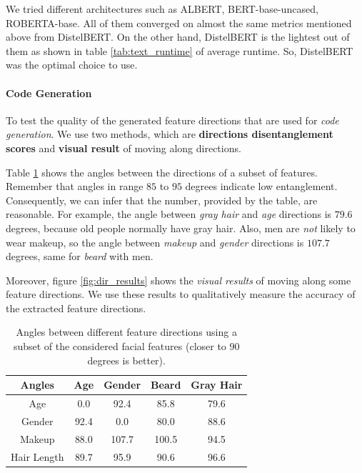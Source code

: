 We tried different architectures such as ALBERT, BERT-base-uncased, ROBERTA-base. All of them converged on almost the same metrics mentioned above from DistelBERT. On the other hand, DistelBERT is the lightest out of them as shown in table \ref{tab:text_runtime} of average runtime. So, DistelBERT was the optimal choice to use.

\paragraph{Code Generation}
To test the quality of the generated feature directions that are used for \emph{code generation}. We use two methods, which are \textbf{directions disentanglement scores} and \textbf{visual result} of moving along directions.

Table \ref{tab:angles} shows the angles between the directions of a subset of features. Remember that angles in range $85$ to $95$ degrees indicate low entanglement. Consequently, we can infer that the number, provided by the table, are reasonable. For example, the angle between \emph{gray hair} and \emph{age} directions is $79.6$ degrees, because old people normally have gray hair. Also, men are \emph{not} likely to wear makeup, so the angle between \emph{makeup} and \emph{gender} directions is $107.7$ degrees, same for \emph{beard} with men.

Moreover, figure \ref{fig:dir_results} shows the \emph{visual results} of moving along some feature directions. We use these results to qualitatively measure the accuracy of the extracted feature directions.

\begin{table}[ht]
\caption{Angles between different feature directions using a subset of the considered facial features (closer to $90$ degrees is better).}
\centering
\begin{tabular}[t]{| c | c | c | c | c |}
\hline
\textbf{Angles} & Age & Gender & Beard & Gray Hair \\
\hline
Age & 0.0 & 92.4 & 85.8 & 79.6 \\
\hline
Gender & 92.4 & 0.0 & 80.0 & 88.6 \\
\hline
Makeup & 88.0 & 107.7 & 100.5 & 94.5 \\
\hline
Hair Length & 89.7 & 95.9 & 90.6 & 96.6 \\
\hline
\end{tabular}

\label{tab:angles}
\end{table}

